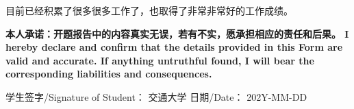 \documentclass[a4paper,zihao=-4,AutoFakeBold]{ctexart}
\begin{document}
目前已经积累了很多很多工作了，也取得了非常非常好的工作成绩。




\vspace{\baselineskip}

\normalfont{}\bfseries\fangsong
\noindent
本人承诺：开题报告中的内容真实无误，若有不实，愿承担相应的责任和后果。
I hereby declare and confirm that the details 
provided in this Form are valid and accurate. 
If anything untruthful found, 
I will bear the corresponding liabilities and consequences.

\vspace{\baselineskip}

\noindent
学生签字/Signature of Student： 交通大学
\hfill              
日期/Date： 202Y-MM-DD
\end{document}
